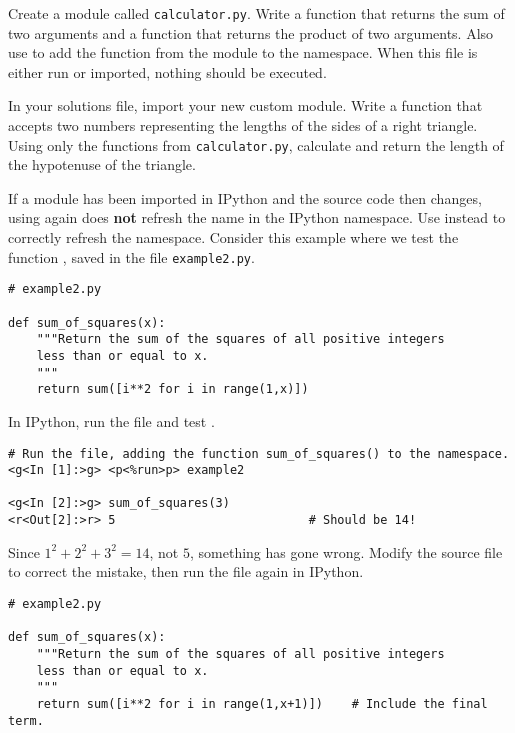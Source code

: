 \begin{problem} %
Create a module called \texttt{calculator.py}.
Write a function that returns the sum of two arguments and a function that returns the product of two arguments.
Also use  to add the  function from the  module to the namespace.
When this file is either run or imported, nothing should be executed.

In your solutions file, import your new custom module.
Write a function that accepts two numbers representing the lengths of the sides of a right triangle.
Using only the functions from \texttt{calculator.py}, calculate and return the length of the hypotenuse of the triangle.
\end{problem}

\begin{warn} %
If a module has been imported in IPython and the source code then changes, using  again does \textbf{not} refresh the name in the IPython namespace.
Use  instead to correctly refresh the namespace.
Consider this example where we test the function , saved in the file \texttt{example2.py}.

\begin{lstlisting}
# example2.py

def sum_of_squares(x):
    """Return the sum of the squares of all positive integers
    less than or equal to x.
    """
    return sum([i**2 for i in range(1,x)])
\end{lstlisting}

In IPython, run the file and test .

\begin{lstlisting}
# Run the file, adding the function sum_of_squares() to the namespace.
<g<In [1]:>g> <p<%run>p> example2

<g<In [2]:>g> sum_of_squares(3)
<r<Out[2]:>r> 5                           # Should be 14!
\end{lstlisting}

Since $1^2 + 2^2 + 3^2 = 14$, not $5$, something has gone wrong.
Modify the source file to correct the mistake, then run the file again in IPython.

\begin{lstlisting}
# example2.py

def sum_of_squares(x):
    """Return the sum of the squares of all positive integers
    less than or equal to x.
    """
    return sum([i**2 for i in range(1,x+1)])    # Include the final term.
\end{lstlisting}


\end{warn}
